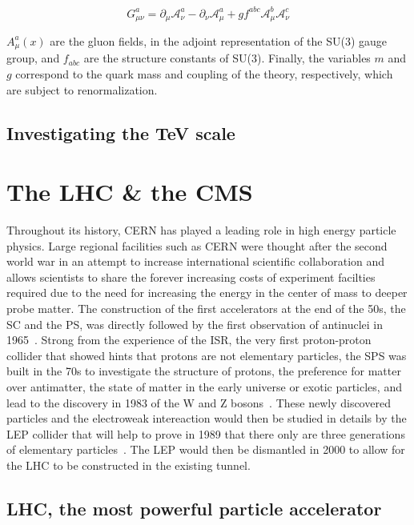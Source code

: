 	\begin{equation}
		\label{eq:gluongauge}
		G^a_{\mu\nu} = \partial_\mu\mathcal{A}^a_\nu - \partial_\nu\mathcal{A}^a_\mu + gf^{abc}\mathcal{A}^b_\mu\mathcal{A}^c_\nu
	\end{equation}
	
	${A}^a_\mu(x)$ are the gluon fields, in the adjoint representation of the SU(3) gauge group, and $f_{abc}$ are the structure constants of SU(3). Finally, the variables $m$ and $g$ correspond to the quark mass and coupling of the theory, respectively, which are subject to renormalization.
	
	\subsection{Investigating the TeV scale}
	\label{chapt2:ssec:TeV}

\section{The \acl{LHC} \& the \acl{CMS}}
\label{chapt2:sec:LHC-CMS}

	Throughout its history, CERN has played a leading role in high energy particle physics. Large regional facilities such as CERN were thought after the second world war in an attempt to increase international scientific collaboration and allows scientists to share the forever increasing costs of experiment facilties required due to the need for increasing the energy in the center of mass to deeper probe matter. The construction of the first accelerators at the end of the 50s, the \acf{SC} and the \acf{PS}, was directly followed by the first observation of antinuclei in 1965~\cite{MASSAM1965}. Strong from the experience of the \acf{ISR}, the very first proton-proton collider that showed hints that protons are not elementary particles, the \acf{SPS} was built in the 70s to investigate the structure of protons, the preference for matter over antimatter, the state of matter in the early universe or exotic particles, and lead to the discovery in 1983 of the W and Z bosons~\cite{UA1W1983,UA2W1983,UA1Z1983,UA2Z1983}. These newly discovered particles and the electroweak intereaction would then be studied in details by the \acf{LEP} collider that will help to prove in 1989 that there only are three generations of elementary particles~\cite{ALEPH1989}. The LEP would then be dismantled in 2000 to allow for the LHC to be constructed in the existing tunnel.

	\subsection{LHC, the most powerful particle accelerator}
	\label{chapt2:ssec:LHC}
	
